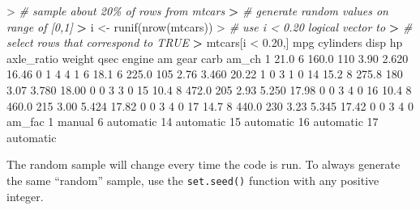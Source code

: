 \documentclass[
]{book}
\newenvironment{Shaded}{\begin{snugshade}}{\end{snugshade}}
\newcommand{\CommentTok}[1]{\textcolor[rgb]{0.56,0.35,0.01}{\textit{#1}}}
\newcommand{\DecValTok}[1]{\textcolor[rgb]{0.00,0.00,0.81}{#1}}
\newcommand{\ErrorTok}[1]{\textcolor[rgb]{0.64,0.00,0.00}{\textbf{#1}}}
\newcommand{\FloatTok}[1]{\textcolor[rgb]{0.00,0.00,0.81}{#1}}
\newcommand{\FunctionTok}[1]{\textcolor[rgb]{0.00,0.00,0.00}{#1}}
\newcommand{\NormalTok}[1]{#1}
\newcommand{\OtherTok}[1]{\textcolor[rgb]{0.56,0.35,0.01}{#1}}
\newcommand{\SpecialCharTok}[1]{\textcolor[rgb]{0.00,0.00,0.00}{#1}}
\begin{document}
\begin{Shaded}
\begin{Highlighting}[]
\SpecialCharTok{\textgreater{}} \CommentTok{\# sample about 20\% of rows from mtcars}
\ErrorTok{\textgreater{}} \CommentTok{\# generate random values on range of [0,1]}
\ErrorTok{\textgreater{}}\NormalTok{ i }\OtherTok{\textless{}{-}} \FunctionTok{runif}\NormalTok{(}\FunctionTok{nrow}\NormalTok{(mtcars))}
\SpecialCharTok{\textgreater{}} \CommentTok{\# use i \textless{} 0.20 logical vector to }
\ErrorTok{\textgreater{}} \CommentTok{\# select rows that correspond to TRUE}
\ErrorTok{\textgreater{}}\NormalTok{ mtcars[i }\SpecialCharTok{\textless{}} \FloatTok{0.20}\NormalTok{,]}
\NormalTok{    mpg cylinders  disp  hp axle\_ratio weight  qsec engine am gear carb am\_ch}
\DecValTok{1}  \FloatTok{21.0}         \DecValTok{6} \FloatTok{160.0} \DecValTok{110}       \FloatTok{3.90}  \FloatTok{2.620} \FloatTok{16.46}      \DecValTok{0}  \DecValTok{1}    \DecValTok{4}    \DecValTok{4}     \DecValTok{1}
\DecValTok{6}  \FloatTok{18.1}         \DecValTok{6} \FloatTok{225.0} \DecValTok{105}       \FloatTok{2.76}  \FloatTok{3.460} \FloatTok{20.22}      \DecValTok{1}  \DecValTok{0}    \DecValTok{3}    \DecValTok{1}     \DecValTok{0}
\DecValTok{14} \FloatTok{15.2}         \DecValTok{8} \FloatTok{275.8} \DecValTok{180}       \FloatTok{3.07}  \FloatTok{3.780} \FloatTok{18.00}      \DecValTok{0}  \DecValTok{0}    \DecValTok{3}    \DecValTok{3}     \DecValTok{0}
\DecValTok{15} \FloatTok{10.4}         \DecValTok{8} \FloatTok{472.0} \DecValTok{205}       \FloatTok{2.93}  \FloatTok{5.250} \FloatTok{17.98}      \DecValTok{0}  \DecValTok{0}    \DecValTok{3}    \DecValTok{4}     \DecValTok{0}
\DecValTok{16} \FloatTok{10.4}         \DecValTok{8} \FloatTok{460.0} \DecValTok{215}       \FloatTok{3.00}  \FloatTok{5.424} \FloatTok{17.82}      \DecValTok{0}  \DecValTok{0}    \DecValTok{3}    \DecValTok{4}     \DecValTok{0}
\DecValTok{17} \FloatTok{14.7}         \DecValTok{8} \FloatTok{440.0} \DecValTok{230}       \FloatTok{3.23}  \FloatTok{5.345} \FloatTok{17.42}      \DecValTok{0}  \DecValTok{0}    \DecValTok{3}    \DecValTok{4}     \DecValTok{0}
\NormalTok{      am\_fac}
\DecValTok{1}\NormalTok{     manual}
\DecValTok{6}\NormalTok{  automatic}
\DecValTok{14}\NormalTok{ automatic}
\DecValTok{15}\NormalTok{ automatic}
\DecValTok{16}\NormalTok{ automatic}
\DecValTok{17}\NormalTok{ automatic}
\end{Highlighting}
\end{Shaded}

The random sample will change every time the code is run. To always generate the same ``random'' sample, use the \texttt{set.seed()} function with any positive integer.
\end{document}
